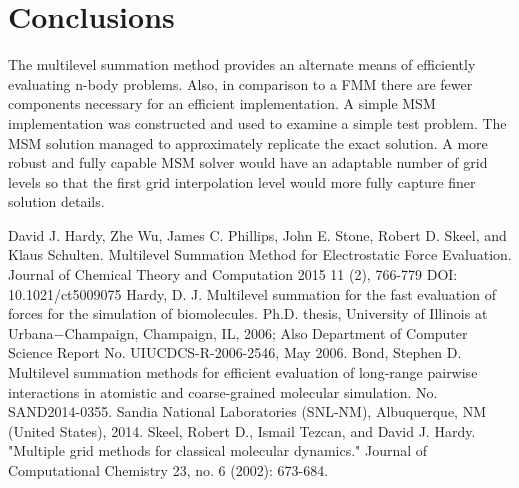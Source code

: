 \documentclass[review]{siamart}
\begin{document}
\section{Conclusions}\label{sec:conc}
The multilevel summation method provides an alternate means of efficiently evaluating n-body problems. Also, in comparison to a FMM there are fewer components necessary for an efficient implementation. A simple MSM implementation was constructed and used to examine a simple test problem. The MSM solution managed to approximately replicate the exact solution. A more robust and fully capable MSM solver would have an adaptable number of grid levels so that the first grid interpolation level would more fully capture finer solution details.
\begin{thebibliography}{3}
 David J. Hardy, Zhe Wu, James C. Phillips, John E. Stone, Robert D. Skeel, and Klaus Schulten. Multilevel Summation Method for Electrostatic Force Evaluation. Journal of Chemical Theory and Computation 2015 11 (2), 766-779 DOI: 10.1021/ct5009075
Hardy, D. J. Multilevel summation for the fast evaluation of forces for the simulation of biomolecules. Ph.D. thesis, University of Illinois at Urbana−Champaign, Champaign, IL, 2006; Also Department of Computer Science Report No. UIUCDCS-R-2006-2546, May 2006.
Bond, Stephen D. Multilevel summation methods for efficient evaluation of long-range pairwise interactions in atomistic and coarse-grained molecular simulation. No. SAND2014-0355. Sandia National Laboratories (SNL-NM), Albuquerque, NM (United States), 2014.
Skeel, Robert D., Ismail Tezcan, and David J. Hardy. "Multiple grid methods for classical molecular dynamics." Journal of Computational Chemistry 23, no. 6 (2002): 673-684.

\end{thebibliography}

\clearpage
\appendix
\end{document}
